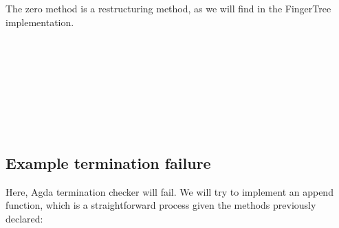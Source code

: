 \documentclass[12pt,twoside,notitlepage]{report}
\begin{document}
The zero method is a restructuring method, as we will find in the FingerTree implementation.

\begin{code}
\\
\>[0]\<[4]%
\>[4] \AgdaSymbol{:} \AgdaSymbol{\{} \AgdaSymbol{:}   \AgdaSymbol{\}} \AgdaSymbol{\{} \AgdaSymbol{:} \AgdaSymbol{\}} \<%
\\
\>[4]\<[6]%
\>[6] \AgdaSymbol{(} \AgdaSymbol{)}  \<%
\\
\>[4]\<[6]%
\>[6]  \<%
\\
\>[0]\<[4]%
\>[4]  \AgdaSymbol{=} \<%
\\
\>[0]\<[4]%
\>[4] \AgdaSymbol{(}  \AgdaSymbol{)} \AgdaSymbol{=}   \AgdaSymbol{(} \AgdaSymbol{)}\<%
\\
\>[0]\<[4]%
\>[4] \AgdaSymbol{(} \AgdaSymbol{(}  \AgdaSymbol{)} \AgdaSymbol{)} \AgdaSymbol{=}   \AgdaSymbol{(}  \AgdaSymbol{)}\<%
\\
\end{code} 

\subsection{Example termination failure}

Here, Agda termination checker will fail. We will try to implement an append function, which is a straightforward process given the methods previously declared:
\end{document}

